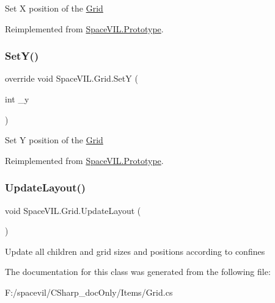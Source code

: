 Set X position of the \mbox{\hyperlink{class_space_v_i_l_1_1_grid}{Grid}} 



Reimplemented from \mbox{\hyperlink{class_space_v_i_l_1_1_prototype}{Space\+V\+I\+L.\+Prototype}}.

\mbox{\label{class_space_v_i_l_1_1_grid_a37ea23fcafda8c5fd8cc8fc41101a20d}} 
\subsubsection{\texorpdfstring{Set\+Y()}{SetY()}}
{\footnotesize\ttfamily override void Space\+V\+I\+L.\+Grid.\+SetY (\begin{DoxyParamCaption}\item[{int}]{\+\_\+y }\end{DoxyParamCaption})\hspace{0.3cm}{\ttfamily [virtual]}}



Set Y position of the \mbox{\hyperlink{class_space_v_i_l_1_1_grid}{Grid}} 



Reimplemented from \mbox{\hyperlink{class_space_v_i_l_1_1_prototype}{Space\+V\+I\+L.\+Prototype}}.

\mbox{\label{class_space_v_i_l_1_1_grid_a3cc929016738df7ef25e984338255a55}} 
\subsubsection{\texorpdfstring{Update\+Layout()}{UpdateLayout()}}
{\footnotesize\ttfamily void Space\+V\+I\+L.\+Grid.\+Update\+Layout (\begin{DoxyParamCaption}{ }\end{DoxyParamCaption})}



Update all children and grid sizes and positions according to confines 



The documentation for this class was generated from the following file\+:\begin{DoxyCompactItemize}
\item 
F\+:/spacevil/\+C\+Sharp\+\_\+doc\+Only/\+Items/Grid.\+cs\end{DoxyCompactItemize}

